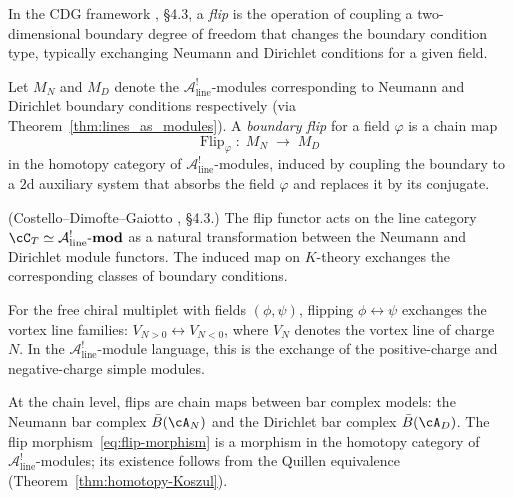 In the CDG framework \cite{CDG2023}, \S4.3, a \emph{flip} is the operation
of coupling a two-dimensional boundary degree of freedom that changes the
boundary condition type, typically exchanging Neumann and Dirichlet
conditions for a given field.

\begin{definition}
\label{def:boundary-flip}
Let $M_N$ and $M_D$ denote the $\mathcal{A}^!_{\mathrm{line}}$-modules corresponding to
Neumann and Dirichlet boundary conditions respectively (via
Theorem~\ref{thm:lines_as_modules}). A \emph{boundary flip} for a field
$\varphi$ is a chain map
\begin{equation}\label{eq:flip-morphism}
 \mathrm{Flip}_\varphi \;:\; M_N \;\longrightarrow\; M_D
\end{equation}
in the homotopy category of $\mathcal{A}^!_{\mathrm{line}}$-modules, induced by coupling
the boundary to a $2$d auxiliary system that absorbs the field $\varphi$
and replaces it by its conjugate.
\end{definition}

\begin{proposition}
\label{prop:flip-natural-transformation}
\textup{(Costello--Dimofte--Gaiotto \cite{CDG2023}, \S4.3.)}
The flip functor acts on the line category
$\cC_T \simeq \mathcal{A}^!_{\mathrm{line}}\text{-}\mathbf{mod}$ as a natural
transformation between the Neumann and Dirichlet module functors.
The induced map on $K$-theory exchanges the corresponding classes of
boundary conditions.
\end{proposition}

\begin{example}
\label{ex:free-chiral-flip}
For the free chiral multiplet with fields $(\phi, \psi)$, flipping
$\phi \leftrightarrow \psi$ exchanges the vortex line families:
$V_{N > 0} \leftrightarrow V_{N < 0}$, where $V_N$ denotes the vortex
line of charge~$N$. In the $\mathcal{A}^!_{\mathrm{line}}$-module language, this is the
exchange of the positive-charge and negative-charge simple modules.
\end{example}

\begin{remark}
\label{rem:flip-bar-cobar}
At the chain level, flips are chain maps between bar complex models:
the Neumann bar complex $\bar{B}(\cA_N)$ and the Dirichlet bar
complex $\bar{B}(\cA_D)$. The flip morphism~\eqref{eq:flip-morphism}
is a morphism in the homotopy category of
$\mathcal{A}^!_{\mathrm{line}}$-modules; its existence follows from
the Quillen equivalence (Theorem~\ref{thm:homotopy-Koszul}).
\end{remark}


